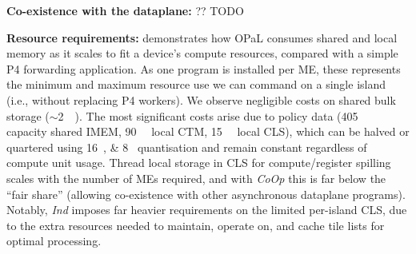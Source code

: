 \documentclass[sigconf,natbib=false]{acmart}
\newcommand{\fakepara}[1]{\noindent\textbf{#1:}}
\newcommand{\approachshort}{OPaL}
\newcommand{\Coopfw}{CoOp}
\newcommand{\Indfw}{Ind}
\begin{document}
\fakepara{Co-existence with the dataplane}
?? TODO

\fakepara{Resource requirements}
 demonstrates how \approachshort{} consumes shared and local memory as it scales to fit a device's compute resources, compared with a simple P4 forwarding application.
As one program is installed per ME, these represents the minimum and maximum resource use we can command on a single island (i.e., without replacing P4 workers).
We observe negligible costs on shared bulk storage ($\sim$\SI{2}{\mebi\byte}).
The most significant costs arise due to policy data (\SI{405}{\kibi\byte} capacity shared IMEM, \SI{90}{\kibi\byte} local CTM, \SI{15}{\kibi\byte} local CLS), which can be halved or quartered using \SIlist{16;8}{\bit} quantisation and remain constant regardless of compute unit usage.
Thread local storage in CLS for compute/register spilling scales with the number of MEs required, and with \emph{\Coopfw} this is far below the ``fair share'' (allowing co-existence with other asynchronous dataplane programs).
Notably, \emph{\Indfw{}} imposes far heavier requirements on the limited per-island CLS, due to the extra resources needed to maintain, operate on, and cache tile lists for optimal processing.
\end{document}
